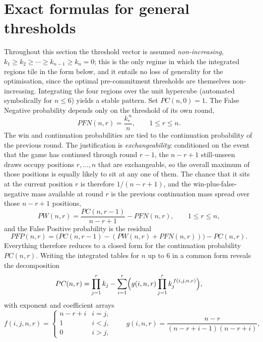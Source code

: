 \documentclass[11pt]{article}
\begin{document}
\section{Exact formulas for general thresholds}\label{sec:general}

Throughout this section the threshold vector is assumed \emph{non-increasing},
$k_1\ge k_2\ge\cdots\ge k_{n-1}\ge k_n=0$; this is the only regime in which the
integrated regions tile in the form below, and it entails no loss of generality for the
optimisation, since the optimal pre-commitment thresholds are themselves non-increasing.
Integrating the four regions over the unit hypercube (automated symbolically for
$n\le 6$) yields a stable pattern. Set $PC(n,0)=1$. The False Negative probability
depends only on the threshold of its own round,
\begin{equation}\label{eq:pfn}
  PFN(n,r)=\frac{k_r^{\,n}}{n},\qquad 1\le r\le n .
\end{equation}
The win and continuation probabilities are tied to the continuation probability of the
previous round. The justification is \emph{exchangeability}: conditioned on the event
that the game has continued through round $r-1$, the $n-r+1$ still-unseen draws occupy
positions $r,\dots,n$ that are exchangeable, so the overall maximum of those positions
is equally likely to sit at any one of them. The chance that it sits at the current
position $r$ is therefore $1/(n-r+1)$, and the win-plus-false-negative mass available at
round $r$ is the previous continuation mass spread over those $n-r+1$ positions,
\begin{equation}\label{eq:pw_rec}
  PW(n,r)=\frac{PC(n,r-1)}{\,n-r+1\,}-PFN(n,r),\qquad 1\le r\le n,
\end{equation}
and the False Positive probability is the residual
\begin{equation}\label{eq:pfp}
  PFP(n,r)=\bigl(PC(n,r-1)-(PW(n,r)+PFN(n,r))\bigr)-PC(n,r).
\end{equation}
Everything therefore reduces to a closed form for the continuation probability
$PC(n,r)$. Writing the integrated tables for $n$ up to $6$ in a common form reveals the
decomposition
\begin{equation}\label{eq:pc}
  PC(n,r)=\prod_{j=1}^{r}k_j-\sum_{i=1}^{r}\Bigl(g(i,n,r)\prod_{j=1}^{r}k_j^{\,f(i,j,n,r)}\Bigr),
\end{equation}
with exponent and coefficient arrays
\begin{equation}\label{eq:fg}
  f(i,j,n,r)=\begin{cases} n-r+i & i=j,\\[2pt] 1 & i<j,\\[2pt] 0 & i>j,\end{cases}
  \qquad
  g(i,n,r)=\frac{n-r}{(n-r+i-1)(n-r+i)} ,
\end{equation}
\end{document}
